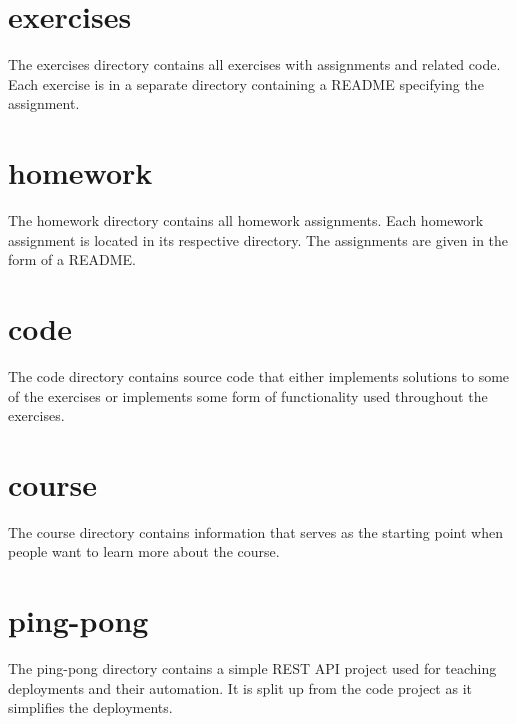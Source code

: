 \documentclass[
  digital,
  color,
  oneside,
  nosansbold,
  nocolorbold,
  lof,
  lot,
]{fithesis4}
\begin{document}
\section{exercises}

The exercises directory contains all exercises with assignments and related code. Each exercise is in a separate directory containing a README specifying the assignment.

\section{homework}

The homework directory contains all homework assignments. Each homework assignment is located in its respective directory. The assignments are given in the form of a README.

\section{code}

The code directory contains source code that either implements solutions to some of the exercises or implements some form of functionality used throughout the exercises.
\section{course}

The course directory contains information that serves as the starting point when people want to learn more about the course.
\section{ping-pong}

The ping-pong directory contains a simple REST API project used for teaching deployments and their automation. It is split up from the code project as it simplifies the deployments.
\end{document}
